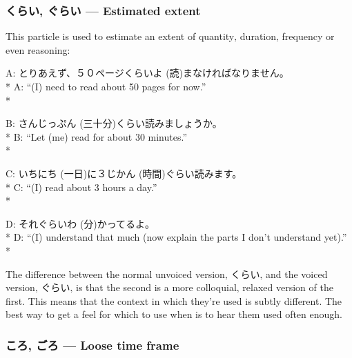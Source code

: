 \documentclass[11pt, b5paper, twoside, openright, onecolumn]{book}
\makeatletter
\newcommand*{\rubystack}[2]{{\relscale{0.5}%
  \begin{tabular}[b]{@{}c@{}}%
    {#1}\\%
   {\textscale{2}{#2}}%
  \end{tabular}}%
}
\DeclareRobustCommand*{\ruby}[2]{%
  \mbox{%
    \setlength{\parskip}{0ex}%
    \BeginAccSupp{method=pdfstringdef,ActualText={#1}}%
      \rubystack{\phantom{#2}}{#1}%
      \llap{%
        \rubystack{#2}{\phantom{#1}}%
      }%
    \EndAccSupp{}%
  }%
}
\renewcommand*{\ruby}[2]{#2 (#1)}%
\newenvironment{exampleblock}{
\setlength{\parindent}{0.6in}
\begin{minipage}[t]{\dimexpr\textwidth-\parindent}}
{\end{minipage}}
\makeatother
\begin{document}
\subsubsection{くらい‚ ぐらい — Estimated extent}

This particle is used to estimate an extent of quantity‚ duration‚ frequency or even reasoning:

\vspace{0.4cm}
\begin{exampleblock}
A: とりあえず、５０ページくらい\ruby{読}{よ}まなければなりません。 \\* 
A: “(I) need to read about 50 pages for now.” \\* 
\end{exampleblock}
\vspace{0.2cm}

\begin{exampleblock}
B: \ruby{三十分}{さんじっぷん}くらい読みましょうか。 \\* 
B: “Let (me) read for about 30 minutes.” \\* 
\end{exampleblock}
\vspace{0.2cm}

\begin{exampleblock}
C: \ruby{一日}{いちにち}に３\ruby{時間}{じかん}ぐらい読みます。 \\* 
C: “(I) read about 3 hours a day.” \\* 
\end{exampleblock}
\vspace{0.2cm}

\begin{exampleblock}
D: それぐらい\ruby{分}{わ}かってるよ。 \\* 
D: “(I) understand that much (now explain the parts I don’t understand yet).” \\* 
\end{exampleblock}
\vspace{0.2cm}

The difference between the normal unvoiced version‚ くらい‚ and the voiced version‚ ぐらい‚ is that the second is a more colloquial‚ relaxed version of the first. This means that the context in which they’re used is subtly different. The best way to get a feel for which to use when is to hear them used often enough.

\subsubsection{ころ‚ ごろ — Loose time frame}
\end{document}
